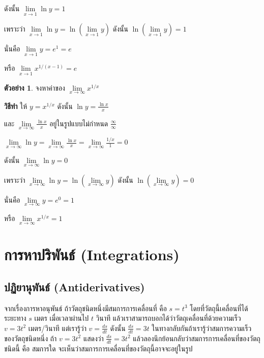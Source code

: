 \documentclass[
]{book}
\theoremstyle{definition}
\theoremstyle{definition}
\newtheorem{example}{ตัวอย่าง}[chapter]
\theoremstyle{definition}
\theoremstyle{definition}
\theoremstyle{remark}
\begin{document}
ดังนั้น \(\mathop {\lim }\limits_{x\to 1} \ln y=1\)

เพราะว่า \(\mathop {\lim }\limits_{x\to 1} \ln y=\ln (\mathop {\lim
}\limits_{x\to 1} y)\) ดังนั้น \(\ln (\mathop {\lim }\limits_{x\to 1} y)=1\)

นั่นคือ \(\mathop {\lim }\limits_{x\to 1} y=e^1=e\)

หรือ \(\mathop {\lim }\limits_{x\to 1} x^{1/(x-1)}=e\)

\begin{example}
จงหาค่าของ \(\mathop {\lim }\limits_{x\to \infty } x^{1/x}\)
\end{example}

\textbf{วิธีทำ} ให้ \(y=x^{1/x}\) ดังนั้น \(\displaystyle \ln y=\frac{\ln x}{x}\)

และ
\(\displaystyle \mathop {\lim }\limits_{x\to \infty } \frac{\ln x}{x}\)
อยู่ในรูปแบบไม่กำหนด \(\displaystyle \frac{\infty }{\infty }\)

\(\displaystyle \mathop {\lim }\limits_{x\to \infty } \ln y=\mathop {\lim
}\limits_{x\to
\infty } \frac{\ln x}{x}=\mathop {\lim }\limits_{x\to \infty }
\frac{1/x}{1}=0\)

ดังนั้น \(\mathop {\lim }\limits_{x\to \infty } \ln y=0\)

เพราะว่า \(\mathop {\lim }\limits_{x\to \infty } \ln y=\ln (\mathop {\lim
}\limits_{x\to \infty } y)\) ดังนั้น \(\ln (\mathop {\lim }\limits_{x\to
\infty } y)=0\)

นั่นคือ \(\mathop {\lim }\limits_{x\to \infty } y=e^0=1\)

หรือ \(\mathop {\lim }\limits_{x\to \infty } x^{1/x}=1\)

\chapter{การหาปริพันธ์ (Integrations)}\label{uxe01uxe32uxe23uxe2buxe32uxe1buxe23uxe1euxe19uxe18-integrations}

\section{ปฏิยานุพันธ์ (Antiderivatives)}\label{uxe1buxe0fuxe22uxe32uxe19uxe1euxe19uxe18-antiderivatives}

จากเรื่องการหาอนุพันธ์ ถ้าวัตถุชนิดหนึ่งมีสมการการเคลื่อนที่ คือ \(s = t^{3}\)
โดยที่วัตถุนี้เคลื่อนที่ได้ระยะทาง \(s\) เมตร เมื่อเวลาผ่านไป \(t\) วินาที
แล้วเราสามารถบอกได้ว่าวัตถุเคลื่อนที่ด้วยความเร็ว \(v =
3t^2\) เมตร/วินาที แต่เรารู้ว่า \(\displaystyle v = \frac{ds}{dt}\) ดังนั้น
\(\displaystyle  \frac{ds}{dt} = 3t\)
ในทางกลับกันถ้าเรารู้ว่าสมการความเร็วของวัตถุชนิดหนึ่ง ถ้า \(v = 3t^{2}\) แสดงว่า
\(\displaystyle \frac{ds}{dt} = 3t^2\)
แล้วลองนึกย้อนกลับว่าสมการการเคลื่อนที่ของวัตถุชนิดนี้ คือ สมการใด
จะเห็นว่าสมการการเคลื่อนที่ของวัตถุนี้อาจจะอยู่ในรูป
\end{document}
